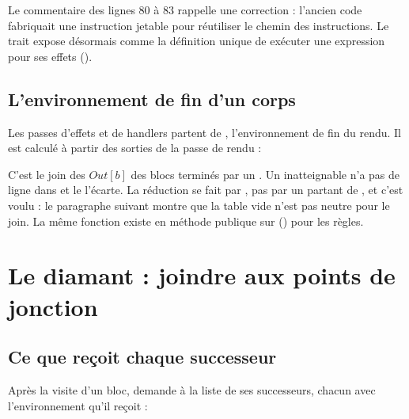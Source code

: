 \begin{remarque}
  Le commentaire des lignes 80 à 83 rappelle une correction : l'ancien code
  fabriquait une instruction  jetable pour réutiliser le
  chemin des instructions. Le trait  expose désormais
   comme la définition unique de \og exécuter une
  expression pour ses effets\fg{} ().
\end{remarque}

\subsection{L'environnement de fin d'un corps}

Les passes d'effets et de handlers partent de , l'environnement
de fin du rendu. Il est calculé à partir des sorties de la passe de rendu :


C'est le join des $\mathit{Out}[b]$ des blocs terminés par un .
Un  inatteignable n'a pas de ligne dans  et le
 l'écarte. La réduction se fait par , pas par un
 partant de , et c'est voulu : le
paragraphe suivant montre que la table vide n'est pas neutre pour le join. La
même fonction existe en méthode publique sur 
() pour les règles.

\section{Le diamant : joindre aux points de jonction}
\label{sec:cfg-analyzer-dominance-diamant}

\subsection{Ce que reçoit chaque successeur}

Après la visite d'un bloc,  demande à  la
liste de ses successeurs, chacun avec l'environnement qu'il reçoit :



